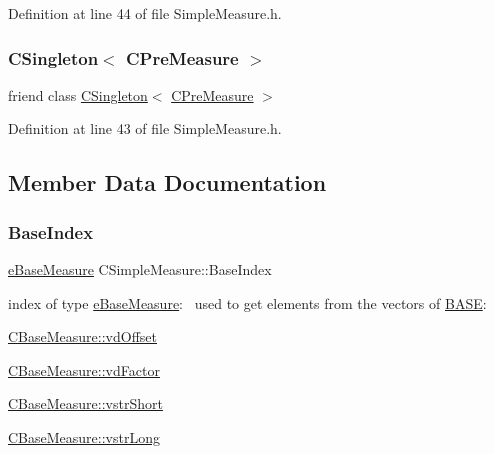 Definition at line 44 of file Simple\+Measure.\+h.

\mbox{\label{classCSimpleMeasure_acbeb06f43abf4b8c9a86136c2b7bfe5f}} 
\subsubsection{\texorpdfstring{C\+Singleton$<$ C\+Pre\+Measure $>$}{CSingleton< CPreMeasure >}}
{\footnotesize\ttfamily friend class \hyperlink{classCSingleton}{C\+Singleton}$<$ \hyperlink{classCPreMeasure}{C\+Pre\+Measure} $>$\hspace{0.3cm}{\ttfamily [friend]}}



Definition at line 43 of file Simple\+Measure.\+h.



\subsection{Member Data Documentation}
\mbox{\label{classCSimpleMeasure_a191dbfa4cc374946bf8a82111f827d92}} 
\subsubsection{\texorpdfstring{Base\+Index}{BaseIndex}}
{\footnotesize\ttfamily \hyperlink{BaseMeasure_8h_ac90e5164ccf1f0d648fba7e94b229a11}{e\+Base\+Measure} C\+Simple\+Measure\+::\+Base\+Index\hspace{0.3cm}{\ttfamily [protected]}}



index of type \hyperlink{BaseMeasure_8h_ac90e5164ccf1f0d648fba7e94b229a11}{e\+Base\+Measure}\+:~\newline
 used to get elements from the vectors of \hyperlink{BaseMeasure_8h_a79bcfb6bde984f42d1124b068a509af7}{B\+A\+SE}\+: 


\begin{DoxyItemize}
\item \hyperlink{classCBaseMeasure_a7220e3dfd4fbdd319a5c3c6af844259e}{C\+Base\+Measure\+::vd\+Offset}
\item \hyperlink{classCVectorHandle_af8f8b2e0da8363e695872ca85f33364e}{C\+Base\+Measure\+::vd\+Factor}
\item \hyperlink{classCVectorHandle_afb50c8a33d4cf70bf92c644dca409ea2}{C\+Base\+Measure\+::vstr\+Short}
\item \hyperlink{classCVectorHandle_a71bec0e385b9ca8e5ffa174b559da9f8}{C\+Base\+Measure\+::vstr\+Long} 
\end{DoxyItemize}

